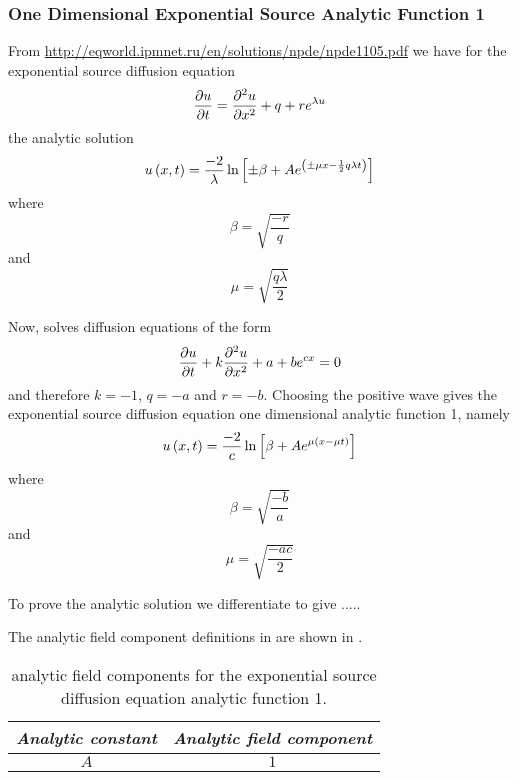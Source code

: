 \subsubsection{One Dimensional Exponential Source Analytic Function 1}

From \url{http://eqworld.ipmnet.ru/en/solutions/npde/npde1105.pdf} we have for
the \oned exponential source diffusion equation
\begin{equation}
   \dfrac{\partial u}{\partial t} = \dfrac{\partial^{2} u}{\partial {x}^{2}} +q+re^{\lambda u}
\end{equation}
the analytic solution
\begin{equation}
   u\left( x,t \right) =\dfrac{-2}{\lambda}\ln\left[ \pm\beta+Ae^{\left( \pm\mu x - \frac{1}{2}q \lambda t \right)} \right]
\end{equation}
where
\begin{equation}
  \beta=\sqrt{\dfrac{-r}{q}}
\end{equation}
and 
\begin{equation}
  \mu=\sqrt{\dfrac{q\lambda}{2}}
\end{equation}

Now, \OpenCMISS solves diffusion equations of the form
\begin{equation}
  \delby{u}{t}+k\deltwosqby{u}{x}+a+be^{cx}=0
  \label{eqn:OpenCMISSExponentialSourceDiffusionEquationOneDim}
\end{equation}
and therefore $k=-1$, $q=-a$ and $r=-b$. Choosing the positive wave gives the
\OpenCMISS exponential source diffusion equation one dimensional analytic function 1, namely
\begin{equation}
  \fnof{u}{x,t}=\dfrac{-2}{c}\ln\sqbrac{\beta+Ae^{\mu\pbrac{x - \mu t}}}
  \label{eqn:AnalyticExponentialSourceDiffusionEquationOneDim1}
\end{equation}
where
\begin{equation}
  \beta=\sqrt{\dfrac{-b}{a}}
\end{equation}
and 
\begin{equation}
  \mu=\sqrt{\dfrac{-ac}{2}}
\end{equation}

To prove the analytic solution we differentiate
 to give .....

The analytic field component definitions in \OpenCMISS are shown in .

\begin{table}[htb] \centering
  \begin{tabular}{|c|c|} \hline
    \emph{Analytic constant} & \emph{Analytic field component} \\ \hline \hline
    $A$ & $1$ \\ \hline
  \end{tabular}
  \caption{\OpenCMISS analytic field components for the \oned exponential
    source diffusion equation analytic function 1.}
  \label{tab:OpenCMISSAnalyticFieldExponentialSoureDiffusionEquationOneDim1}
\end{table}

